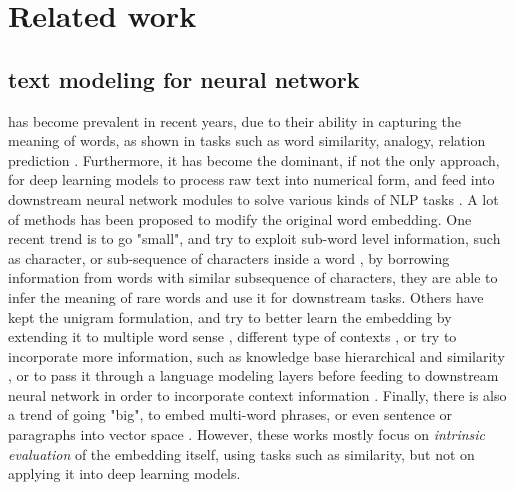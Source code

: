 

\section{Related work}
\subsection{text modeling for neural network}
has become prevalent in recent years, due to their ability in capturing the meaning of words, as shown in 
tasks such as word similarity, analogy, relation prediction \cite{turian2010word, pennington2014glove, mikolov2013distributed}.
Furthermore, it has become the dominant, if not the only approach, for deep learning models to process raw text into numerical form, and feed into downstream neural network modules to solve various kinds of NLP tasks  \cite{collobert2011natural, wu2016google, conneau2017very, severyn2015learning}.
A lot of methods has been proposed to modify the original word embedding. One recent trend is to go "small", and try to exploit sub-word level information, such as character, or sub-sequence of characters inside a word \cite{wieting2016charagram, bojanowski2016enriching, pinter2017mimicking}, by borrowing information from words with similar subsequence of characters, they are able to infer the meaning of rare words and use it for downstream tasks. 
Others have kept the unigram formulation, and try to better learn the embedding by extending it to multiple word sense \cite{neelakantan2015efficient, athiwaratkun2017multimodal}, 
different type of contexts \cite{levy2014dependency, melamud2016role}, 
or try to incorporate more information, such as knowledge base hierarchical and similarity \cite{nickel2017poincare, faruqui2014retrofitting}, 
or to pass it through a language modeling layers before feeding to downstream neural network in order to incorporate context information \cite{mccann2017learned, peters2018deep}.
Finally, there is also a trend of going "big", to embed multi-word phrases, or even sentence or paragraphs into vector space \cite{mikolov2013distributed, hill2015learning, arora2016simple} . 
However, these works mostly focus on \emph{intrinsic evaluation} of the embedding itself, using tasks such as similarity, but not on applying it into deep learning models.

